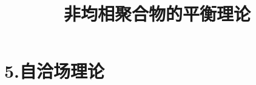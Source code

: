 \documentclass[12pt,a4paper]{article}
\title{非均相聚合物的平衡理论}
\author{}
\date{\chntoday}
\numberwithin{equation}{section}
\begin{document}
\maketitle
\section{}
\section{}
\section{}
\section{}
\section{5.自洽场理论}





\cite{tam19912d}

\end{document}
